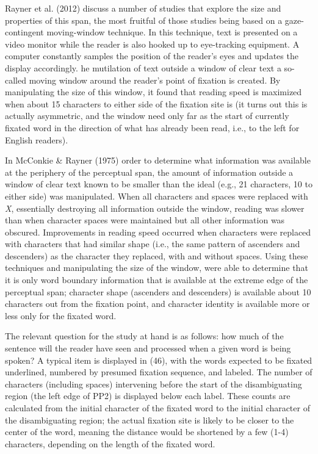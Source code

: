 \documentclass[12pt,oneside]{book}
\begin{document}
Rayner et al. (2012) discuss a number of studies that explore the size and properties of this span, the most fruitful of those studies being based on a gaze-contingent moving-window technique. In this technique, text is presented on a video monitor while the reader is also hooked up to eye-tracking equipment. A computer constantly samples the position of the reader's eyes and updates the display accordingly. he mutilation of text outside a window of clear text a so-called moving window around the reader's point of fixation is created. By manipulating the size of this window, it  found that reading speed is maximized when about 15 characters to either side of the fixation site is  (it turns out this is actually asymmetric, and the window need only  far as the start of  currently fixated word in the direction of what has already been read, i.e., to the left for English readers).

In  McConkie \& Rayner (1975) order to determine what information was available at the periphery of the perceptual span, the amount of information outside a window of clear text known to be smaller than the ideal (e.g., 21 characters, 10 to either side) was manipulated. When all  characters and spaces were replaced with \emph{X}, essentially destroying all information outside the window, reading was slower than when character spaces were maintained\deleted{,} but all other information was obscured. Improvements in reading speed  occurred when  characters  were replaced with characters that had similar shape (i.e., the same pattern of ascenders and descenders) as the character they replaced, with and without spaces. Using these techniques and manipulating the size of the window,  were able to determine that it is only word boundary information that is available at the extreme edge of the perceptual span; character shape (ascenders and descenders) is available about 10 characters out from the fixation point, and character identity is available more or less only for the fixated word.

The relevant question for the study at hand is as follows: how much of the sentence will the reader have seen and processed when a given word is being spoken? A typical item  is displayed in (46), with the words expected to be fixated underlined, numbered by presumed fixation sequence, and labeled. The number of characters (including spaces) intervening before the start of the disambiguating region (the left edge of PP2) is displayed below each label. These counts are calculated from the initial character of the fixated word to the initial character of the disambiguating region; the actual fixation site is likely to be closer to the center of the word, meaning the distance would be shortened by a few (1-4) characters, depending on the length of the fixated word.
\end{document}
